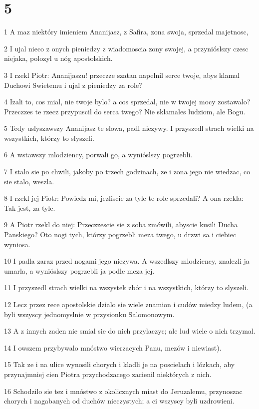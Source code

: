 \chapter{5}

\par 1 A maz niektóry imieniem Ananijasz, z Safira, zona swoja, sprzedal majetnosc,
\par 2 I ujal nieco z onych pieniedzy z wiadomoscia zony swojej, a przynióslszy czesc niejaka, polozyl u nóg apostolskich.
\par 3 I rzekl Piotr: Ananijaszu! przeczze szatan napelnil serce twoje, abys klamal Duchowi Swietemu i ujal z pieniedzy za role?
\par 4 Izali to, cos mial, nie twoje bylo? a cos sprzedal, nie w twojej mocy zostawalo? Przeczzes te rzecz przypuscil do serca twego? Nie sklamales ludziom, ale Bogu.
\par 5 Tedy uslyszawszy Ananijasz te slowa, padl niezywy. I przyszedl strach wielki na wszystkich, którzy to slyszeli.
\par 6 A wstawszy mlodziency, porwali go, a wynióslszy pogrzebli.
\par 7 I stalo sie po chwili, jakoby po trzech godzinach, ze i zona jego nie wiedzac, co sie stalo, weszla.
\par 8 I rzekl jej Piotr: Powiedz mi, jezliscie za tyle te role sprzedali? A ona rzekla: Tak jest, za tyle.
\par 9 A Piotr rzekl do niej: Przeczzescie sie z soba zmówili, abyscie kusili Ducha Panskiego? Oto nogi tych, którzy pogrzebli meza twego, u drzwi sa i ciebiec wyniosa.
\par 10 I padla zaraz przed nogami jego niezywa. A wszedlszy mlodziency, znalezli ja umarla, a wynióslszy pogrzebli ja podle meza jej.
\par 11 I przyszedl strach wielki na wszystek zbór i na wszystkich, którzy to slyszeli.
\par 12 Lecz przez rece apostolskie dzialo sie wiele znamion i cudów miedzy ludem, (a byli wszyscy jednomyslnie w przysionku Salomonowym.
\par 13 A z innych zaden nie smial sie do nich przylaczyc; ale lud wiele o nich trzymal.
\par 14 I owszem przybywalo mnóstwo wierzacych Panu, mezów i niewiast).
\par 15 Tak ze i na ulice wynosili chorych i kladli je na poscielach i lózkach, aby przynajmniej cien Piotra przychodzacego zacienil niektórych z nich.
\par 16 Schodzilo sie tez i mnóstwo z okolicznych miast do Jeruzalemu, przynoszac chorych i nagabanych od duchów nieczystych; a ci wszyscy byli uzdrowieni.
